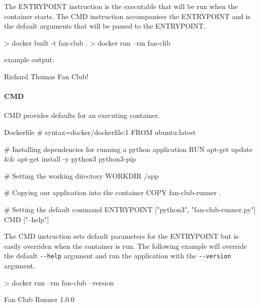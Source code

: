 \documentclass{csse4400}
\begin{document}
The ENTRYPOINT instruction is the executable that will be run when the container starts.
The CMD instruction accompanises the ENTRYPOINT and is the default arguments that will be passed to the ENTRYPOINT.

\begin{code}[language=shell,numbers=none]{}
> docker built -t fan-club .
> docker run --rm fan-clib
\end{code}

example output:

\begin{code}[language=shell,numbers=none]{}
Richard Thomas Fan Club!
\end{code}

\paragraph{CMD}
CMD provides defaults for an executing container.

\begin{code}[language=docker,numbers=none]{Dockerfile}
# syntax=docker/dockerfile:1
FROM ubuntu:latest

# Installing dependencies for running a python application
RUN apt-get update && apt-get install -y python3 python3-pip

# Setting the working directory
WORKDIR /app

# Copying our application into the container
COPY fan-club-runner .

# Setting the default command
ENTRYPOINT ["python3", "fan-club-runner.py"]
CMD ["--help"]
\end{code}

The CMD instruction sets default parameters for the ENTRYPOINT but is easily overriden when the container is run.
The following example will override the default \texttt{-{}-help} argument and run the application with the \texttt{-{}-version} argument.

\begin{code}[language=shell,numbers=none]{}
> docker run --rm fan-club --version
\end{code}

\begin{code}[language=shell,numbers=none]{}
  Fan Club Runner 1.0.0
\end{code}

\end{document}

